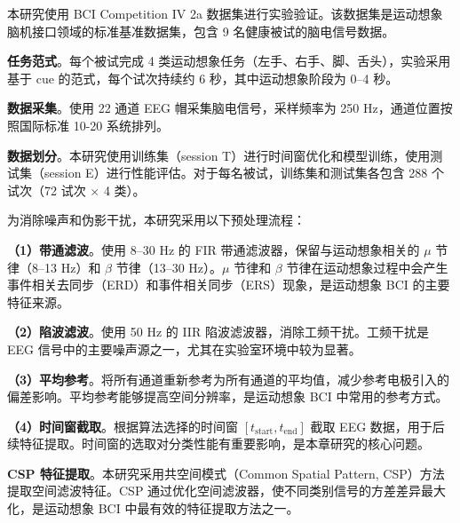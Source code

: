 \label{subsec:dataset}

本研究使用 BCI Competition IV 2a 数据集进行实验验证\cite{tangermann2012review}。该数据集是运动想象脑机接口领域的标准基准数据集，包含 9 名健康被试的脑电信号数据。

\textbf{任务范式}。每个被试完成 4 类运动想象任务（左手、右手、脚、舌头），实验采用基于 cue 的范式，每个试次持续约 6 秒，其中运动想象阶段为 0--4 秒。

\textbf{数据采集}。使用 22 通道 EEG 帽采集脑电信号，采样频率为 250 Hz，通道位置按照国际标准 10-20 系统排列。

\textbf{数据划分}。本研究使用训练集（session T）进行时间窗优化和模型训练，使用测试集（session E）进行性能评估。对于每名被试，训练集和测试集各包含 288 个试次（72 试次 $\times$ 4 类）。

\label{subsec:preprocessing}

为消除噪声和伪影干扰，本研究采用以下预处理流程\cite{delorme2004eeglab}：

\textbf{（1）带通滤波}。使用 8--30 Hz 的 FIR 带通滤波器，保留与运动想象相关的 $\mu$ 节律（8--13 Hz）和 $\beta$ 节律（13--30 Hz）。$\mu$ 节律和 $\beta$ 节律在运动想象过程中会产生事件相关去同步（ERD）和事件相关同步（ERS）现象，是运动想象 BCI 的主要特征来源\cite{pfurtscheller1999event}。

\textbf{（2）陷波滤波}。使用 50 Hz 的 IIR 陷波滤波器，消除工频干扰。工频干扰是 EEG 信号中的主要噪声源之一，尤其在实验室环境中较为显著。

\textbf{（3）平均参考}。将所有通道重新参考为所有通道的平均值，减少参考电极引入的偏差影响。平均参考能够提高空间分辨率，是运动想象 BCI 中常用的参考方式。

\textbf{（4）时间窗截取}。根据算法选择的时间窗 $[t_{\text{start}}, t_{\text{end}}]$ 截取 EEG 数据，用于后续特征提取。时间窗的选取对分类性能有重要影响，是本章研究的核心问题。

\label{subsec:feature_classification}

\textbf{CSP 特征提取}。本研究采用共空间模式（Common Spatial Pattern, CSP）方法提取空间滤波特征\cite{blankertz2008optimizing, mcfarland1997spatial}。CSP 通过优化空间滤波器，使不同类别信号的方差差异最大化，是运动想象 BCI 中最有效的特征提取方法之一。

